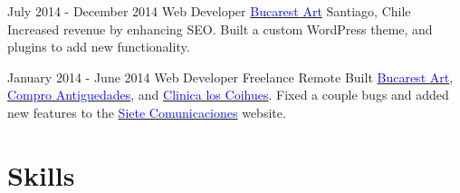 \documentclass[11pt,a4paper,sans]{moderncv}        %
\begin{document}
\cventry  
  {July 2014 - December 2014}
  {Web Developer}
  {\textmd{\href{http://bucarestart.cl}{\textcolor{blue}{Bucarest Art}}}}
  {\textmd{Santiago, Chile}}{}
  {
    Increased revenue by enhancing SEO.
    Built a custom WordPress theme, and plugins to add new functionality.
  }

\cventry
  {January 2014 - June 2014}
  {Web Developer}
  {\textmd{Freelance}}
  {\textmd{Remote}}{}
  {
    Built \textmd{\href{http://bucarestart.cl}{\textcolor{blue}{Bucarest Art}}},
    \textmd{\href{https://web.archive.org/web/20160306131956/http://comproantiguedades.cl/}{\textcolor{blue}{Compro Antiguedades}}},
    and \textmd{\href{http://www.clinicaloscoihues.cl/}{\textcolor{blue}{Clinica los Coihues}}}.
    Fixed a couple bugs and added new features to the \textmd{\href{http://www.sietecomunicaciones.cl/}{\textcolor{blue}{Siete Comunicaciones}}} website.
  }

\section{Skills}
\end{document}
